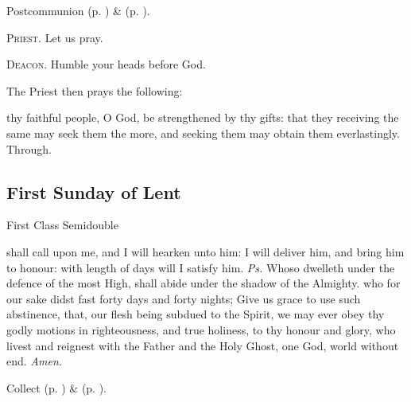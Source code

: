 \begin{rubric}
     Postcommunion  (p. \pageref{AshWednesdayMassPostcommunion}) \&   (p. \pageref{SPLivingDeparted}).
\end{rubric}

\textsc{Priest.} Let us pray.\par
\textsc{Deacon.} Humble your heads before God.\par
\begin{rubric}
    The Priest then prays the following:
\end{rubric}
 thy faithful people, O God, be strengthened by thy gifts: that they receiving the same may seek them the more, and seeking them may obtain them everlastingly. Through.


\subsection{First Sunday of Lent}
\fancyhead[RE,LO]{}
\begin{inhead}
{First Class Semidouble}
\end{inhead}


\introit
{} shall call upon me, and I will hearken unto him: I will deliver him, and bring him to honour: with length of days will I satisfy him. \textit{Ps.} Whoso dwelleth under the defence of the most High, shall abide under the shadow of the Almighty.
\collect
{} who for our sake didst fast forty days and forty nights; Give us grace to use such abstinence, that, our flesh being subdued to the Spirit, we may ever obey thy godly motions in righteousness, and true holiness, to thy honour and glory, who livest and reignest with the Father and the Holy Ghost, one God, world without end. \textit{Amen.}

\begin{rubric}
     Collect  (p. \pageref{AshWednesdayMassCollect}) \&   (p. \pageref{SPLivingDeparted}).
\end{rubric}

